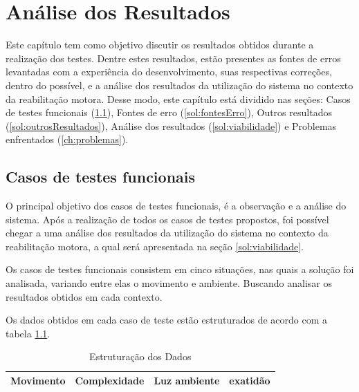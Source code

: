 
\chapter[Análise dos Resultados]{Análise dos Resultados}\label{ch:analiseResultados}
  Este capítulo tem como objetivo discutir  os resultados obtidos durante a realização dos testes. Dentre estes
resultados, estão presentes as fontes de erros levantadas com a experiência do desenvolvimento,
suas respectivas correções, dentro do possível, e a análise dos resultados da utilização do
sistema no contexto da reabilitação motora. Desse modo, este
capítulo está dividido nas seções: Casos de testes funcionais (\ref{sec:testes}),
Fontes de erro (\ref{sol:fontesErro}), Outros resultados (\ref{sol:outrosResultados}), Análise dos resultados (\ref{sol:viabilidade}) e Problemas enfrentados (\ref{ch:problemas}).

\section{Casos de testes funcionais}\label{sec:testes}
  O principal objetivo dos casos de testes funcionais, é a observação e a análise do sistema. Após a realização de todos os casos de testes propostos, foi possível chegar a
uma análise dos resultados da utilização do sistema no contexto da reabilitação motora,
 a qual será apresentada na seção \ref{sol:viabilidade}.

 Os casos de testes funcionais consistem em cinco situações, nas quais a solução foi analisada,
variando entre elas o movimento e ambiente. Buscando analisar os resultados obtidos em cada contexto.

  Os dados obtidos em cada caso de teste estão estruturados de acordo com a tabela \ref{tab:analise}.

  \begin{table}[H]
  \centering
  \caption{Estruturação dos Dados}
  \label{tab:analise}
  \begin{tabular}{@{}|l|l|l|l|@{}}
  \toprule
  \textbf{Movimento} & \textbf{Complexidade} & \textbf{Luz ambiente} & \textbf{exatidão} \\ \bottomrule
  \end{tabular}
  \end{table}

